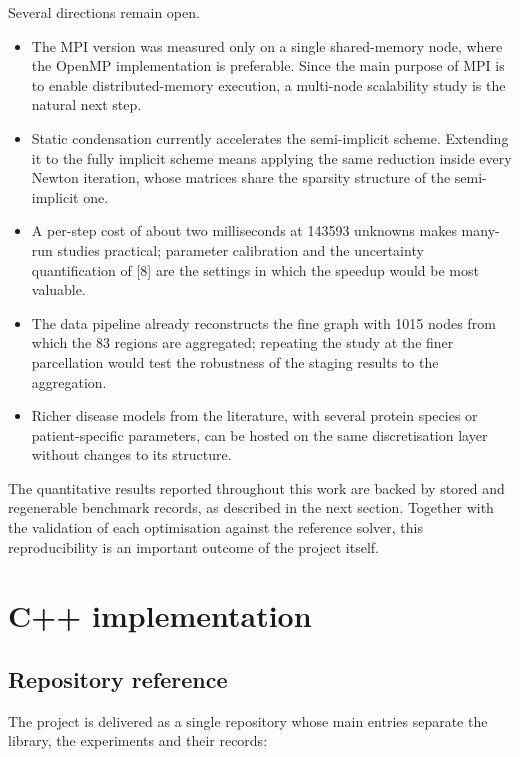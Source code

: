 \documentclass[11pt,a4paper]{article}
\begin{document}
Several directions remain open.
\begin{itemize}
\item The MPI version was measured only on a single shared-memory node, where
the OpenMP implementation is preferable. Since the main purpose of MPI is to
enable distributed-memory execution, a multi-node scalability study is the
natural next step.

\item Static condensation currently accelerates the semi-implicit scheme.
Extending it to the fully implicit scheme means applying the same reduction
inside every Newton iteration, whose matrices share the sparsity structure
of the semi-implicit one.

\item A per-step cost of about two milliseconds at 143593 unknowns makes
many-run studies practical; parameter calibration and the uncertainty
quantification of [8] are the settings in which the speedup would be most
valuable.

\item The data pipeline already reconstructs the fine graph with 1015 nodes
from which the 83 regions are aggregated; repeating the study at the finer
parcellation would test the robustness of the staging results to the
aggregation.

\item Richer disease models from the literature, with several protein species
or patient-specific parameters, can be hosted on the same discretisation layer
without changes to its structure.
\end{itemize}

The quantitative results reported throughout this work are backed by stored
and regenerable benchmark records, as described in the next section.
Together with the validation of each optimisation against the reference
solver, this reproducibility is an important outcome of the project itself.\\

\section{C++ implementation}

\subsection{Repository reference}

The project is delivered as a single repository whose main entries separate
the library, the experiments and their records:
\end{document}
